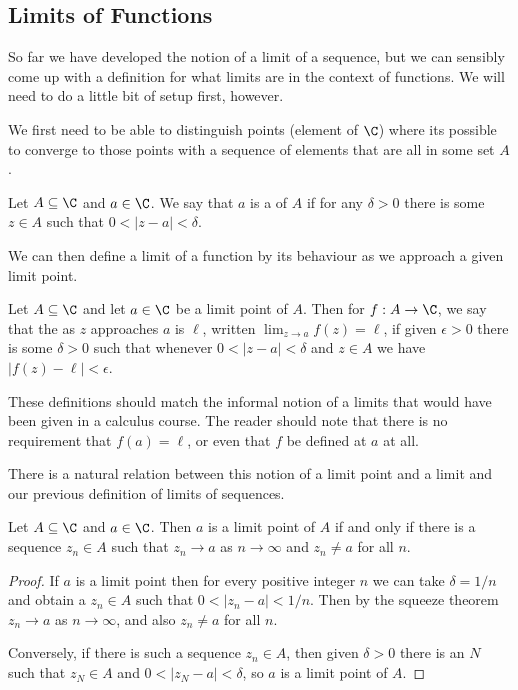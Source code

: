 \documentclass[a4paper]{scrartcl}
\begin{document}
\subsection{Limits of Functions}\label{sec:lim-of-func}

So far we have developed the notion of a limit of a sequence, but we can sensibly come up with a definition for what limits are in the context of functions. We will need to do a little bit of setup first, however.

We first need to be able to distinguish points (element of $\C$) where its possible to converge to those points with a sequence of elements that are all in some set $A$.

\begin{definition}
	Let $A \subseteq \C$ and $a \in \C$. We say that $a$ is a  of $A$ if for any $\delta > 0$ there is some $z \in A$ such that $0 < |z - a| < \delta$.
\end{definition}

We can then define a limit of a function by its behaviour as we approach a given limit point.

\begin{definition}
	Let $A \subseteq \C$ and let $a \in \C$ be a limit point of $A$. Then for $f: A \rightarrow \C$, we say that the  as $z$ approaches $a$ is $\ell$, written $\displaystyle\lim_{z \to a} f(z) = \ell$, if given $\epsilon > 0$ there is some $\delta > 0$ such that whenever $0 < |z - a| < \delta$ and $z \in A$ we have $|f(z) - \ell| < \epsilon$.
\end{definition}


These definitions should match the informal notion of a limits that would have been given in a calculus course. The reader should note that there is no requirement that $f(a) = \ell$, or even that $f$ be defined at $a$ at all.

There is a natural relation between this notion of a limit point and a limit and our previous definition of limits of sequences.

\begin{proposition}
	Let $A \subseteq \C$ and $a \in \C$. Then $a$ is a limit point of $A$ if and only if there is a sequence $z_n \in A$ such that $z_n \rightarrow a$ as $n \rightarrow \infty$ and $z_n \neq a$ for all $n$. 
\end{proposition}
\begin{proof}
	If $a$ is a limit point then for every positive integer $n$ we can take $\delta = 1/n$ and obtain a $z_n \in A$ such that $0 < |z_n - a| < 1/n$. Then by the squeeze theorem $z_n \rightarrow a$ as $n \rightarrow \infty$, and also $z_n \neq a$ for all $n$.

	Conversely, if there is such a sequence $z_n \in A$, then given $\delta > 0$ there is an $N$ such that $z_N \in A$ and $0 < |z_N - a| < \delta$, so $a$ is a limit point of $A$.
\end{proof}
\end{document}
